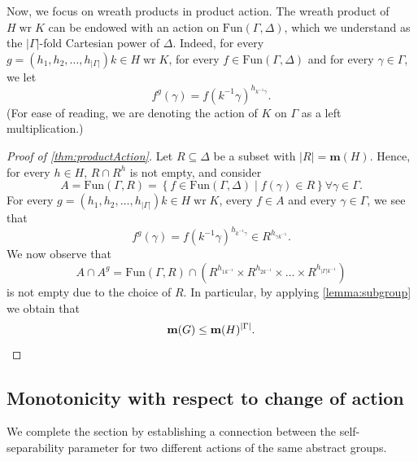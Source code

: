 \documentclass[a4paper]{amsart}
\newcommand{\Fun}{\mathrm{Fun}}
\renewcommand{\wr}{\mathop{\mathrm{wr}}}
\newcommand{\m}{\mathbf{m}}
\theoremstyle{definition}
\newtheorem*{thmnon}{Theorem}
\begin{document}
Now, we focus on wreath products in product action. The wreath product of $H \wr K$ can be endowed with an action on $\Fun(\Gamma, \Delta)$, which we understand as the $|\Gamma|$-fold Cartesian power of $\Delta$. Indeed, for every $g = (h_1, h_2, \ldots, h_{|\Gamma|}) k \in H \wr K$, for every $f\in \Fun(\Gamma, \Delta)$ and for every $\gamma \in \Gamma$, we let
\[ f^g(\gamma) = f \left(k^{-1}\gamma \right)^{h_{k^{-1}\gamma}}.\]
(For ease of reading, we are denoting the action of $K$ on $\Gamma$ as a left multiplication.)%

\begin{proof}[Proof of \cref{thm:productAction}]
    Let $R \subseteq \Delta$ be a subset with $|R|=\m(H).$ Hence, for every $h\in H$, $R\cap R^h$ is not empty, and consider
    \[A = \Fun (\Gamma,R) = \left\{ f \in \Fun(\Gamma, \Delta) \mid  f(\gamma)\in R \right\} \forall \gamma\in \Gamma .\]
    For every $g = (h_1, h_2, \ldots, h_{|\Gamma|}) k \in H \wr K$,  every $f\in A$ and every $\gamma \in \Gamma$, we see that
    \[ f^g(\gamma) = f \left(k^{-1}\gamma\right)^{h_{k^{-1} \gamma}} \in R^{h_{\gamma k^{-1}}} . \]
    We now observe that
    \[ A \cap A^g = \Fun (\Gamma,R) \cap \left( R^{h_{1 k^{-1}}} \times R^{h_{2 k^{-1}}} \times \ldots \times R^{h_{|\Gamma| k^{-1}}} \right)\]
    is not empty due to the choice of $R$. In particular, by applying \cref{lemma:subgroup} we obtain that
    \[ \m(G) \le \m(H) ^ {|\Gamma|} . \qedhere \]
\end{proof}

\subsection{Monotonicity with respect to change of action}
We complete the section by establishing a connection between the self-separability parameter for two different actions of the same abstract groups.
\end{document}
